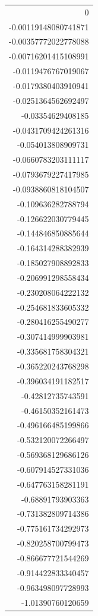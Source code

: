 \documentclass[11pt]{article}
\begin{document}
\begin{center}
\begin{tabular}{r}
0\\
-0.00119148080741871\\
-0.00357772022778088\\
-0.00716201415108991\\
-0.0119476767019067\\
-0.0179380403910941\\
-0.0251364562692497\\
-0.03354629408185\\
-0.0431709424261316\\
-0.054013808909731\\
-0.0660783203111117\\
-0.0793679227417985\\
-0.0938860818104507\\
-0.109636282788794\\
-0.126622030779445\\
-0.144846850885644\\
-0.164314288382939\\
-0.185027908892833\\
-0.206991298558434\\
-0.230208064222132\\
-0.254681833605332\\
-0.280416255490277\\
-0.307414999903981\\
-0.335681758304321\\
-0.365220243768298\\
-0.396034191182517\\
-0.42812735743591\\
-0.46150352161473\\
-0.496166485199866\\
-0.532120072266497\\
-0.569368129686126\\
-0.607914527331036\\
-0.647763158281191\\
-0.68891793903363\\
-0.731382809714386\\
-0.775161734292973\\
-0.820258700799473\\
-0.866677721544269\\
-0.914422833340457\\
-0.963498097728993\\
-1.01390760120659\\

\end{tabular}
\end{center}
\end{document}

